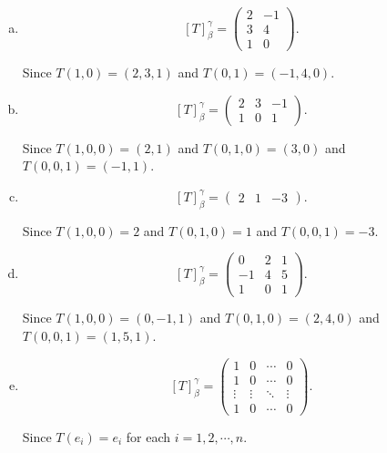 \begin{Exercise}
\begin{enumerate}[(a)]
\item
\begin{answer}
$$
[T]_{\beta}^{\gamma} = \begin{pmatrix}
2 & -1 \\
3 & 4 \\
1 & 0
\end{pmatrix}.
$$
\end{answer}
\begin{solution}
Since $T(1,0) = (2,3,1)$ and $T(0,1) = (-1,4,0)$.
\end{solution}

\item
\begin{answer}
$$
[T]_{\beta}^{\gamma} = \begin{pmatrix}
2 & 3 & -1 \\
1 & 0 & 1
\end{pmatrix}.
$$
\end{answer}
\begin{solution}
Since $T(1,0,0) = (2,1)$ and $T(0,1,0) = (3,0)$ and $T(0,0,1) = (-1,1)$.
\end{solution}

\item
\begin{answer}
$$
[T]_{\beta}^{\gamma} = \begin{pmatrix}
2 & 1 & -3
\end{pmatrix}.
$$
\end{answer}
\begin{solution}
Since $T(1,0,0) = 2$ and $T(0,1,0) = 1$ and $T(0,0,1) = -3$.
\end{solution}

\item
\begin{answer}
$$
[T]_{\beta}^{\gamma} = \begin{pmatrix}
0 & 2 & 1 \\
-1 & 4 & 5 \\
1 & 0 & 1
\end{pmatrix}.
$$
\end{answer}
\begin{solution}
Since $T(1,0,0) = (0,-1,1)$ and $T(0,1,0) = (2,4,0)$ and $T(0,0,1) = (1,5,1)$.
\end{solution}

\item
\begin{answer}
$$
[T]_{\beta}^{\gamma} = \begin{pmatrix}
1 & 0 & \cdots & 0 \\
1 & 0 & \cdots & 0 \\
\vdots & \vdots & \ddots & \vdots \\
1 & 0 & \cdots & 0
\end{pmatrix}.
$$
\end{answer}
\begin{solution}
Since $T(e_i) = e_i$ for each $i=1,2,\cdots, n$.
\end{solution}


\end{enumerate}
\end{Exercise}
